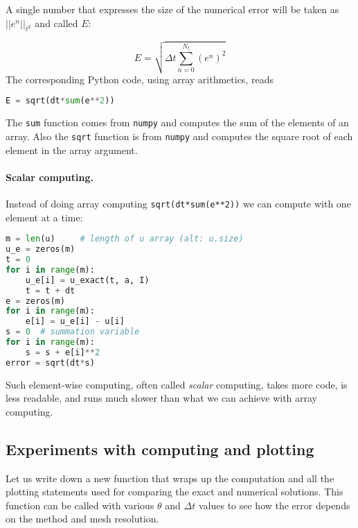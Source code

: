 \documentclass[graybox,sectrefs,envcountresetchap,open=right,final]{svmonodo}
\begin{document}

A single number that expresses the size of the numerical error
will be taken as $||e^n||_{\ell^2}$ and called $E$:

\begin{equation}
E = \sqrt{\Delta t\sum_{n=0}^{N_t} (e^n)^2}
\label{decay:E}
\end{equation}
The corresponding Python code, using array arithmetics, reads

\begin{lstlisting}[language=Python,style=blue1_bluegreen]
E = sqrt(dt*sum(e**2))
\end{lstlisting}
The \texttt{sum} function comes from \texttt{numpy} and computes the sum of the elements
of an array. Also the \texttt{sqrt} function is from \texttt{numpy} and computes the
square root of each element in the array argument.


\paragraph{Scalar computing.}
Instead of doing array computing \texttt{sqrt(dt*sum(e**2))} we can compute with
one element at a time:
\begin{lstlisting}[language=Python,style=blue1_bluegreen]
m = len(u)     # length of u array (alt: u.size)
u_e = zeros(m)
t = 0
for i in range(m):
    u_e[i] = u_exact(t, a, I)
    t = t + dt
e = zeros(m)
for i in range(m):
    e[i] = u_e[i] - u[i]
s = 0  # summation variable
for i in range(m):
    s = s + e[i]**2
error = sqrt(dt*s)
\end{lstlisting}
Such element-wise computing, often called \emph{scalar} computing, takes
more code, is less readable, and runs much slower than what we
can achieve with array computing.





\subsection{Experiments with computing and plotting}


Let us write down a new function that wraps up the computation and all
the plotting statements used for comparing the exact and numerical
solutions. This function can be called with various $\theta$ and
$\Delta t$ values to see how the error depends on the method and mesh
resolution.
\end{document}
